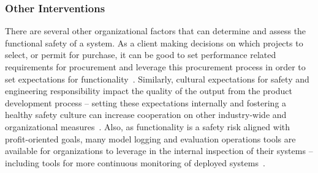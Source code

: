 \documentclass[acmconf,manuscript,screen,natbib=true]{acmart}
\begin{document}

\subsubsection{Other Interventions}

There are several other organizational factors that can determine and assess the functional safety of a system. As a client making decisions on which projects to select, or permit for purchase, it can be good to set performance related requirements for procurement and leverage this procurement process in order to set expectations for functionality~\cite{sloane2021ai,mulligan2019procurement,richardson2021best,rubenstein2021acquiring}. Similarly, cultural expectations for safety and engineering responsibility impact the quality of the output from the product development process -- setting these expectations internally and fostering a healthy safety culture can increase cooperation on other industry-wide and organizational measures~\cite{roland1991system}. Also, as functionality is a safety risk aligned with profit-oriented goals, many model logging and evaluation operations tools are available for organizations to leverage in the internal inspection of their systems -- including tools for more continuous monitoring of deployed systems~\cite{ratner2019mlsys,shankar2021towards}. 




\end{document}
